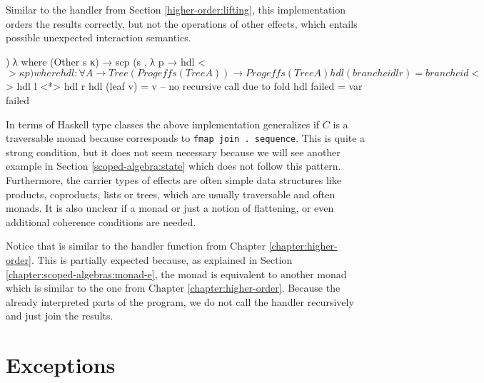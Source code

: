 \begin{AgdaAlign}
Similar to the handler from Section \ref{higher-order:lifting}, this
implementation orders the results correctly, but not the operations of other
effects, which entails possible unexpected interaction semantics.

\begin{code}
  ) λ where
    (Other s κ)  → scp (s , λ p → hdl <$> κ p)
  where
    hdl : ∀ {A} → Tree (Prog effs (Tree A)) → Prog effs (Tree A)
    hdl (branch cid l r)  = branch cid <$> hdl l <*> hdl r
    hdl (leaf v)          = v -- no recursive call due to fold
    hdl failed            = var failed
\end{code}
\end{AgdaAlign}
In terms of Haskell type classes the above implementation generalizes if $C$ is
a traversable monad because  corresponds to
\texttt{fmap join . sequence}.
This is quite a strong condition, but it does not seem necessary because we
will see another example in Section \ref{scoped-algebra:state} which does not
follow this pattern.
Furthermore, the carrier types of effects are often simple data structures like
products, coproducts, lists or trees, which are usually traversable and often
monads.
It is also unclear if a monad or just a notion of flattening, or even
additional coherence conditions are needed.

Notice that  is similar to the handler function from
Chapter \ref{chapter:higher-order}.
This is partially expected because, as explained in Section
\ref{chapter:scoped-algebras:monad-e}, the  monad is
equivalent to another monad which is similar to the one from Chapter
\ref{chapter:higher-order}. 
Because the  already interpreted parts of the program, we do
not call the handler recursively and just join the results.


\section{Exceptions}

